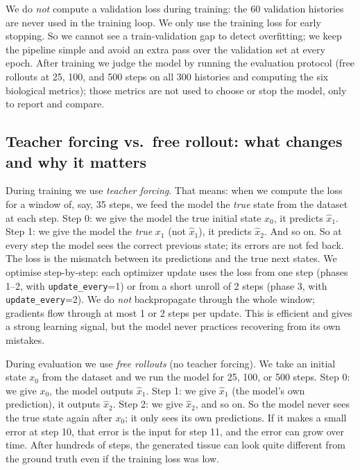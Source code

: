 We do \emph{not} compute a validation loss during training: the 60 validation histories are never used in the training loop.
We only use the training loss for early stopping.
So we cannot see a train-validation gap to detect overfitting; we keep the pipeline simple and avoid an extra pass over the validation set at every epoch.
After training we judge the model by running the evaluation protocol (free rollouts at 25, 100, and 500 steps on all 300 histories and computing the six biological metrics); those metrics are not used to choose or stop the model, only to report and compare.

\subsection{Teacher forcing vs.\ free rollout: what changes and why it matters}
\label{sec:impl:curriculum:teacher_vs_free}

During training we use \emph{teacher forcing}.
That means: when we compute the loss for a window of, say, 35 steps, we feed the model the \emph{true} state from the dataset at each step.
Step 0: we give the model the true initial state \(x_0\), it predicts \(\hat{x}_1\).
Step 1: we give the model the \emph{true} \(x_1\) (not \(\hat{x}_1\)), it predicts \(\hat{x}_2\).
And so on.
So at every step the model sees the correct previous state; its errors are not fed back.
The loss is the mismatch between its predictions and the true next states.
We optimise step-by-step: each optimizer update uses the loss from one step (phases 1--2, with \texttt{update\_every}=1) or from a short unroll of 2 steps (phase 3, with \texttt{update\_every}=2).
We do \emph{not} backpropagate through the whole window; gradients flow through at most 1 or 2 steps per update.
This is efficient and gives a strong learning signal, but the model never practices recovering from its own mistakes.

During evaluation we use \emph{free rollouts} (no teacher forcing).
We take an initial state \(x_0\) from the dataset and we run the model for 25, 100, or 500 steps.
Step 0: we give \(x_0\), the model outputs \(\hat{x}_1\).
Step 1: we give \emph{\(\hat{x}_1\)} (the model's own prediction), it outputs \(\hat{x}_2\).
Step 2: we give \(\hat{x}_2\), and so on.
So the model never sees the true state again after \(x_0\); it only sees its own predictions.
If it makes a small error at step 10, that error is the input for step 11, and the error can grow over time.
After hundreds of steps, the generated tissue can look quite different from the ground truth even if the training loss was low.

